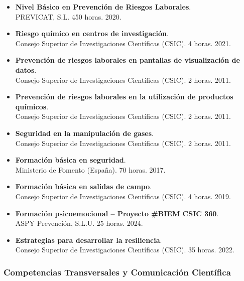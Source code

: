 \documentclass[11pt,a4paper]{article}
\begin{document}
\begin{itemize}[leftmargin=*]
    \item \textbf{Nivel Básico en Prevención de Riesgos Laborales}.\\
    PREVICAT, S.L. 450 horas. 2020.

    \item \textbf{Riesgo químico en centros de investigación}.\\
    Consejo Superior de Investigaciones Científicas (CSIC). 4 horas. 2021.

    \item \textbf{Prevención de riesgos laborales en pantallas de visualización de datos}.\\
    Consejo Superior de Investigaciones Científicas (CSIC). 2 horas. 2011.

    \item \textbf{Prevención de riesgos laborales en la utilización de productos químicos}.\\
    Consejo Superior de Investigaciones Científicas (CSIC). 2 horas. 2011.

    \item \textbf{Seguridad en la manipulación de gases}.\\
    Consejo Superior de Investigaciones Científicas (CSIC). 2 horas. 2011.

    \item \textbf{Formación básica en seguridad}.\\
    Ministerio de Fomento (España). 70 horas. 2017.

    \item \textbf{Formación básica en salidas de campo}.\\
    Consejo Superior de Investigaciones Científicas (CSIC). 4 horas. 2019.

    \item \textbf{Formación psicoemocional -- Proyecto \#BIEM CSIC 360}.\\
    ASPY Prevención, S.L.U. 25 horas. 2024.

    \item \textbf{Estrategias para desarrollar la resiliencia}.\\
    Consejo Superior de Investigaciones Científicas (CSIC). 35 horas. 2022.
\end{itemize}

\subsubsection{Competencias Transversales y Comunicación Científica}
\end{document}
